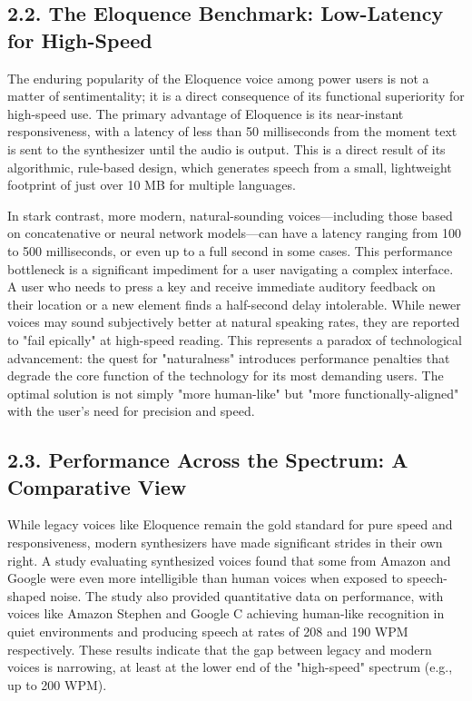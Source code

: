 \subsection{2.2. The Eloquence Benchmark: Low-Latency for High-Speed}
The enduring popularity of the Eloquence voice among power users is not
a matter of sentimentality; it is a direct consequence of its functional
superiority for high-speed use. The primary advantage of Eloquence is
its near-instant responsiveness, with a latency of less than 50
milliseconds from the moment text is sent to the synthesizer until the
audio is output.\supercite{11} This is a direct result of its algorithmic,
rule-based design, which generates speech from a small, lightweight
footprint of just over 10 MB for multiple languages.\supercite{7}

In stark contrast, more modern, natural-sounding voices---including
those based on concatenative or neural network models---can have a
latency ranging from 100 to 500 milliseconds, or even up to a full
second in some cases.\supercite{11} This performance bottleneck is a significant
impediment for a user navigating a complex interface. A user who needs
to press a key and receive immediate auditory feedback on their location
or a new element finds a half-second delay intolerable. While newer
voices may sound subjectively better at natural speaking rates, they are
reported to "fail epically" at high-speed reading.\supercite{11} This represents
a paradox of technological advancement: the quest for "naturalness"
introduces performance penalties that degrade the core function of the
technology for its most demanding users. The optimal solution is not
simply "more human-like" but "more functionally-aligned" with the
user's need for precision and speed.

\subsection{2.3. Performance Across the Spectrum: A Comparative View}
While legacy voices like Eloquence remain the gold standard for pure
speed and responsiveness, modern synthesizers have made significant
strides in their own right. A study evaluating synthesized voices found
that some from Amazon and Google were even more intelligible than human
voices when exposed to speech-shaped noise.\supercite{18} The study also provided
quantitative data on performance, with voices like Amazon Stephen and
Google C achieving human-like recognition in quiet environments and
producing speech at rates of 208 and 190 WPM respectively.\supercite{18} These
results indicate that the gap between legacy and modern voices is
narrowing, at least at the lower end of the "high-speed" spectrum
(e.g., up to 200 WPM).

